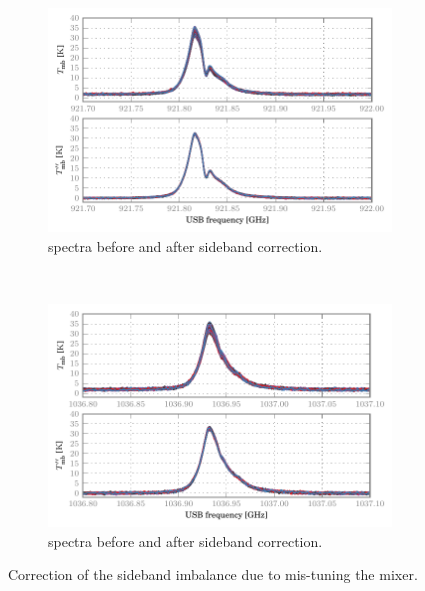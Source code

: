 \begin{figure}
    \centering
    \begin{subfigure}[b]{\textwidth}
        \centering
        \includegraphics{correction_87}
        \vspace{-.8em}
        \caption{ spectra before and after sideband correction.}
    \end{subfigure}
    \\
    \bigskip
    \begin{subfigure}[b]{\textwidth}
        \centering
        \includegraphics{correction_98}
        \vspace{-.8em}
        \caption{ spectra before and after sideband correction.}
    \end{subfigure}
    \caption{
        Correction of the sideband imbalance due to mis-tuning the mixer.
    }
    \label{fig:diplexer_correction}
\end{figure}



